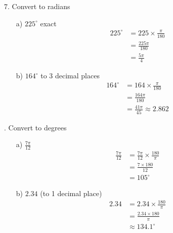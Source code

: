 \documentclass{article}
\begin{document}
7. Convert to radians
\begin{enumerate}
    \item[a)] \( 225^{\circ} \) exact
    \begin{align*}
        225^{\circ} &= 225 \times \frac{\pi}{180} \\
        &= \frac{225\pi}{180} \\
        &= \frac{5\pi}{4}
    \end{align*}
    \item[b)] \( 164^{\circ} \) to 3 decimal places
    \begin{align*}
        164^{\circ} &= 164 \times \frac{\pi}{180} \\
        &= \frac{164\pi}{180} \\
        &= \frac{41\pi}{45} \approx 2.862
    \end{align*}
\end{enumerate}
. Convert to degrees
\begin{enumerate}
    \item[a)] \( \frac{7\pi}{12} \)
    \begin{align*}
        \frac{7\pi}{12} &= \frac{7\pi}{12} \times \frac{180}{\pi} \\
        &= \frac{7 \times 180}{12} \\
        &= 105^{\circ}
    \end{align*}
    \item[b)] \( 2.34 \) (to 1 decimal place)
    \begin{align*}
        2.34 &= 2.34 \times \frac{180}{\pi} \\
        &= \frac{2.34 \times 180}{\pi} \\
        &\approx 134.1^{\circ}
    \end{align*}
\end{enumerate}
\end{document}
